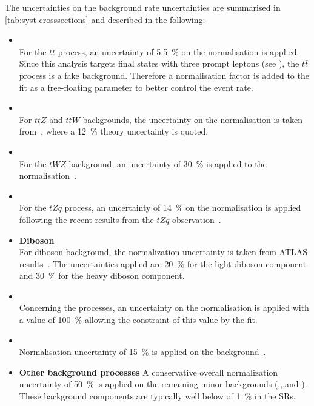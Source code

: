 \noindent The uncertainties on the background rate uncertainties are summarised in
\cref{tab:syst-crosssections} and described in the following:
\begin{itemize}
	\item \textbf{\ttbar} \\
	For the $t\bar{t}$ process, an uncertainty of \SI{5.5}{\%} on the normalisation is applied. Since this analysis targets final states with three prompt leptons (see ), the $t\bar{t}$ process is a fake background.
	Therefore a normalisation factor is added to the fit as a free-floating parameter to better control the event rate.
	\item \textbf{\ttV} \\
	For $t\bar{t}Z$ and $t\bar{t}W$ backgrounds, the uncertainty on the normalisation is taken from~\cite{ATL-COM-PHYS-2018-140}, where a \SI{12}{\%} theory uncertainty is quoted.
	\item \textbf{\tWZ} \\
	For the $tWZ$ background, an uncertainty of \SI{30}{\%} is applied to the normalisation~\cite{Bylund:2016qau}.
	\item \textbf{\tZq} \\
	For the $tZq$ process, an uncertainty of \SI{14}{\%} on the normalisation is applied following the recent results from the $tZq$ observation~\cite{Aad:2020wog}.
	\item \textbf{Diboson} \\
	For diboson background, the normalization uncertainty is taken from ATLAS results~\cite{STDM-2018-03}. The uncertainties applied are \SI{20}{\%} for the light diboson component and \SI{30}{\%} for the heavy diboson component. 
	\item \textbf{\Zjets} \\
	Concerning the \Zjets processes, an uncertainty on the normalisation is applied with a value of \SI{100}{\%} allowing the constraint of this value by the fit.
	\item \textbf{\ttH} \\
	Normalisation uncertainty of \SI{15}{\%} is applied on the \ttH background~\cite{Demartin:2016axk}. 
	\item \textbf{Other background processes} 
	A conservative overall normalization uncertainty of \SI{50}{\%} is applied
	on the remaining minor backgrounds (\ttt,\tttt,\VVV,\VH and \ttWW). 
	These background components are typically well below of \SI{1}{\%} in the SRs.
\end{itemize}

